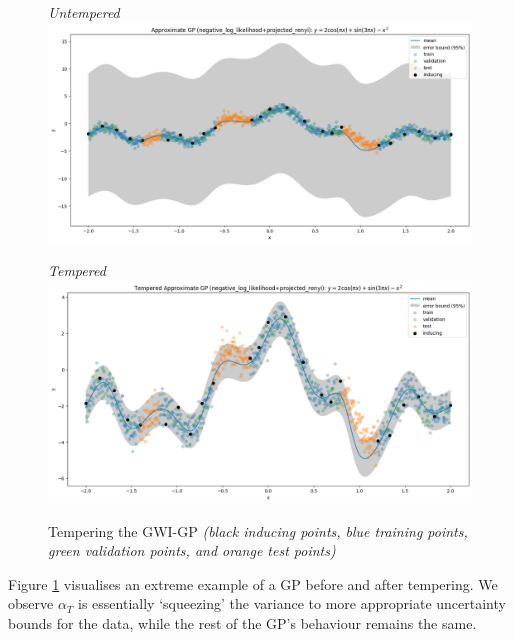 \documentclass{article}
\numberwithin{equation}{section}
\begin{document}
\begin{figure}[h!]
\small
\centering
\begin{minipage}{.5\textwidth}
  \centering
  \textit{Untempered}
  \includegraphics[width=\linewidth, trim={0 0 0 0.84cm},clip]{thesis-report/figures/tempering/untempered.png}
\end{minipage}%
\begin{minipage}{.5\textwidth}
  \centering
  \textit{Tempered}
  \includegraphics[width=\linewidth, trim={0 0 0 0.85cm},clip]{thesis-report/figures/tempering/tempered.png}
\end{minipage}%
\caption{Tempering the GWI-GP \textit{(black inducing points, blue training points, green validation points, and orange test points)}}
\label{fig:tempered-gwi}
\end{figure}

Figure \ref{fig:tempered-gwi} visualises an extreme example of a GP before and after tempering. We observe $\alpha_T$ is essentially `squeezing' the variance to more appropriate uncertainty bounds for the data, while the rest of the GP's behaviour remains the same.
\end{document}
